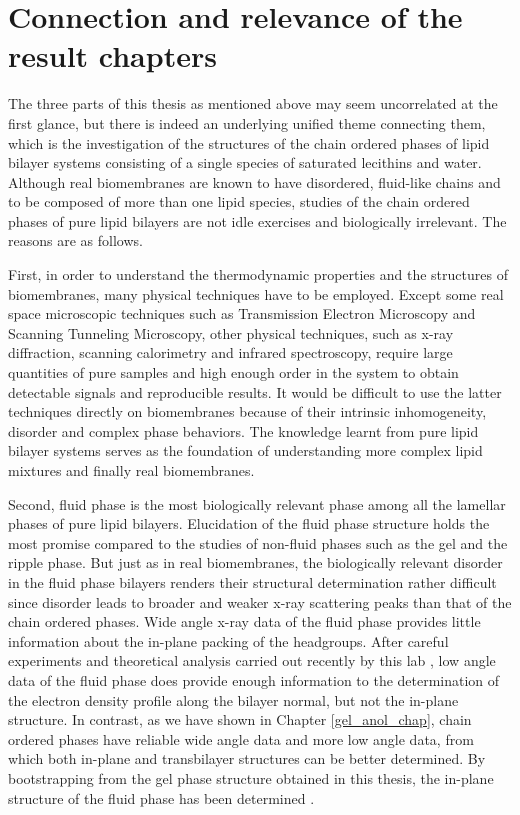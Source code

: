 \section{Connection and relevance of the result chapters}
\label{theme}

The three parts of this thesis as mentioned above may seem uncorrelated 
at the first glance, but there is indeed an underlying unified theme 
connecting them, which is the investigation of the structures of the chain 
ordered phases of lipid bilayer systems consisting of a single species of 
saturated lecithins and water. Although real biomembranes are known to 
have disordered, fluid-like chains and to be composed of more than 
one lipid species, studies of the chain ordered phases of pure lipid bilayers 
are not idle exercises and biologically irrelevant. The reasons are as follows.

First, in order to understand the thermodynamic properties and the structures
of biomembranes, many physical techniques have to be employed. Except some
real space microscopic techniques such as Transmission Electron Microscopy
and Scanning Tunneling Microscopy, other physical techniques, such as x-ray 
diffraction, scanning calorimetry and infrared spectroscopy, require large 
quantities of pure samples and high enough order in the system to obtain 
detectable signals and reproducible results. It would be difficult to use 
the latter techniques directly on biomembranes because of their intrinsic 
inhomogeneity, disorder and complex phase behaviors. The knowledge learnt 
from pure lipid bilayer systems serves as the foundation of understanding 
more complex lipid mixtures and finally real biomembranes.

Second, fluid phase is the most biologically relevant phase among all the 
lamellar phases of pure lipid bilayers. Elucidation of the fluid phase
structure holds the most promise compared to the studies of non-fluid
phases such as the gel and the ripple phase. But just as in real biomembranes,
the biologically relevant disorder in the fluid phase bilayers renders their 
structural determination rather difficult since disorder leads to broader
and weaker x-ray scattering peaks than that of the chain ordered phases. 
Wide angle x-ray data of the fluid phase provides little information
about the in-plane packing of the headgroups. After careful experiments and
theoretical analysis carried out recently by this lab \cite{N96}, low angle 
data of the fluid phase does provide enough information to the determination 
of the electron density profile along the bilayer normal, but not the in-plane
structure. In contrast, as we have shown in Chapter \ref{gel_anol_chap}, 
chain ordered phases have reliable wide angle data and more low angle data,
from which both in-plane and transbilayer structures can be better determined.
By bootstrapping from the gel phase structure obtained in this thesis, the
in-plane structure of the fluid phase has been determined \cite{N96}.

